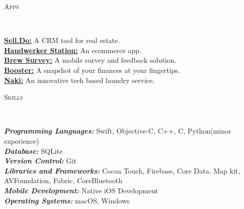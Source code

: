 \documentclass[9pt]{article}
\newenvironment{changemargin}[2]{%
  \begin{list}{}{%
    \setlength{\topsep}{0pt}%
    \setlength{\leftmargin}{#1}%
    \setlength{\rightmargin}{#2}%
    \setlength{\listparindent}{\parindent}%
    \setlength{\itemindent}{\parindent}%
    \setlength{\parsep}{\parskip}%
  }%
  \item[]}{\end{list}
}
\newcommand{\lineover}{
    \begin{changemargin}{-0.05in}{-0.05in}
        \vspace*{-8pt}
        \hrulefill \\
        \vspace*{-2pt}
    \end{changemargin}
}
\newcommand{\header}[1]{
    \begin{changemargin}{-0.5in}{-0.5in}
        \scshape{#1}\\
    \lineover
    \end{changemargin}
}
\newenvironment{body} {
    \vspace*{-16pt}
    \begin{changemargin}{-0.25in}{-0.5in}
  }
    {\end{changemargin}
}
\begin{document}
\smallskip


\header{Apps}

\begin{body}
    \vspace{14pt}
    \href{https://apps.apple.com/us/app/sell-do/id1225486345}{\textbf{Sell.Do:}}{} A CRM tool for real estate. \\
    \vspace*{2pt}
    \href{https://apps.apple.com/us/app/handwerkerstation/id1247972146}{\textbf{Handwerker Station:}}{} An ecommerce app. \\
    \vspace*{2pt}
    \href{https://apps.apple.com/us/app/brew-survey-offline-feedback/id1207197946}{\textbf{Brew Survey:}}{} A mobile survey and feedback solution. \\
    \vspace*{2pt}
    \href{https://itunes.apple.com/nz/app/booster-nz/id1179170506?mt=8}{\textbf{Booster:}}{} A snapshot of your finances at your fingertips. \\
    \vspace*{2pt}
    \href{https://itunes.apple.com/in/app/naki-laundry/id621934237?mt=8}{\textbf{Naki:}}{} An innovative tech based laundry service. \\
\end{body}

\smallskip


\header{Skills}

\begin{body}
    \vspace{14pt}
    \emph{\textbf{Programming Languages:}}{} Swift, Objective-C, C++, C, Python(minor experience)\\
    \vspace*{2pt}
    \emph{\textbf{Database:}}{} SQLite\\
    \vspace*{2pt}
    \emph{\textbf{Version Control:}}{} Git\\
    \vspace*{2pt}
    \emph{\textbf{Libraries and Frameworks:}}{} Cocoa Touch, Firebase, Core Data, Map kit, AVFoundation,
Fabric, CoreBluetooth \\
\vspace*{2pt}
    \emph{\textbf{Mobile Development:}}{} Native iOS Development \\
    \vspace*{2pt}
    \emph{\textbf{Operating Systems:}}{} macOS, Windows\\
\end{body}
\end{document}
